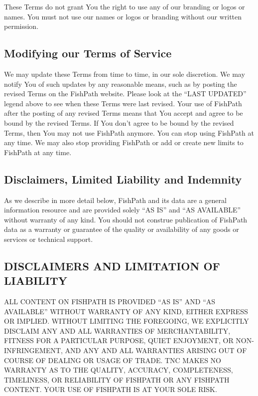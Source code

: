 \documentclass[11pt,]{book}
\begin{document}
These Terms do not grant You the right to use any of our branding or
logos or names. You must not use our names or logos or branding without
our written permission.

\hypertarget{modifying-our-terms-of-service}{%
\subsection*{Modifying our Terms of
Service}\label{modifying-our-terms-of-service}}

We may update these Terms from time to time, in our sole discretion. We
may notify You of such updates by any reasonable means, such as by
posting the revised Terms on the FishPath website. Please look at the
``LAST UPDATED'' legend above to see when these Terms were last revised.
Your use of FishPath after the posting of any revised Terms means that
You accept and agree to be bound by the revised Terms. If You don't
agree to be bound by the revised Terms, then You may not use FishPath
anymore. You can stop using FishPath at any time. We may also stop
providing FishPath or add or create new limits to FishPath at any time.

\hypertarget{disclaimers-limited-liability-and-indemnity}{%
\subsection*{Disclaimers, Limited Liability and
Indemnity}\label{disclaimers-limited-liability-and-indemnity}}

As we describe in more detail below, FishPath and its data are a general
information resource and are provided solely ``AS IS'' and ``AS
AVAILABLE'' without warranty of any kind. You should not construe
publication of FishPath data as a warranty or guarantee of the quality
or availability of any goods or services or technical support.

\hypertarget{disclaimers-and-limitation-of-liability}{%
\subsection*{DISCLAIMERS AND LIMITATION OF
LIABILITY}\label{disclaimers-and-limitation-of-liability}}

ALL CONTENT ON FISHPATH IS PROVIDED ``AS IS'' AND ``AS AVAILABLE''
WITHOUT WARRANTY OF ANY KIND, EITHER EXPRESS OR IMPLIED. WITHOUT
LIMITING THE FOREGOING, WE EXPLICITLY DISCLAIM ANY AND ALL WARRANTIES OF
MERCHANTABILITY, FITNESS FOR A PARTICULAR PURPOSE, QUIET ENJOYMENT, OR
NON-INFRINGEMENT, AND ANY AND ALL WARRANTIES ARISING OUT OF COURSE OF
DEALING OR USAGE OF TRADE. TNC MAKES NO WARRANTY AS TO THE QUALITY,
ACCURACY, COMPLETENESS, TIMELINESS, OR RELIABILITY OF FISHPATH OR ANY
FISHPATH CONTENT. YOUR USE OF FISHPATH IS AT YOUR SOLE RISK.
\end{document}
